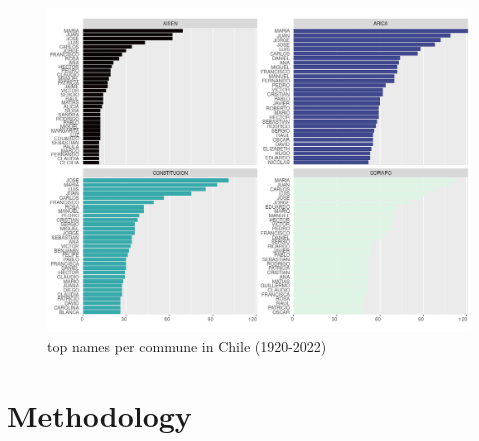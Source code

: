 \begin{figure}[H]
    \centering
    \includegraphics[width=13cm]{plot/top_nombre_comuna2.png}
    \caption{top names per commune in Chile (1920-2022)}
    \label{}
\end{figure}


\section{Methodology}




